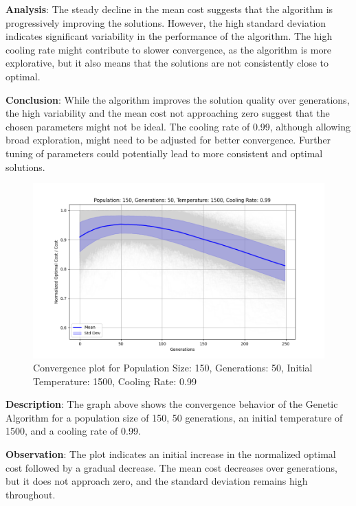 \documentclass{article}
\begin{document}
    \textbf{Analysis}: The steady decline in the mean cost suggests that the algorithm is progressively improving the solutions. However, the high standard deviation indicates significant variability in the performance of the algorithm. The high cooling rate might contribute to slower convergence, as the algorithm is more explorative, but it also means that the solutions are not consistently close to optimal.

    \textbf{Conclusion}: While the algorithm improves the solution quality over generations, the high variability and the mean cost not approaching zero suggest that the chosen parameters might not be ideal. The cooling rate of 0.99, although allowing broad exploration, might need to be adjusted for better convergence. Further tuning of parameters could potentially lead to more consistent and optimal solutions.

    \begin{figure}[H]
        \centering
        \includegraphics[width=\textwidth]{genetic_simulated_annealing_hybrid/Population_150_Generations_50_Temperature_1500_CoolingRate_0.99}
        \caption{Convergence plot for Population Size: 150, Generations: 50, Initial Temperature: 1500, Cooling Rate: 0.99}
        \label{fig:pop150_gen50_temp1500_cr0.99}
    \end{figure}

    \textbf{Description}: The graph above shows the convergence behavior of the Genetic Algorithm for a population size of 150, 50 generations, an initial temperature of 1500, and a cooling rate of 0.99.

    \textbf{Observation}: The plot indicates an initial increase in the normalized optimal cost followed by a gradual decrease. The mean cost decreases over generations, but it does not approach zero, and the standard deviation remains high throughout.
\end{document}
